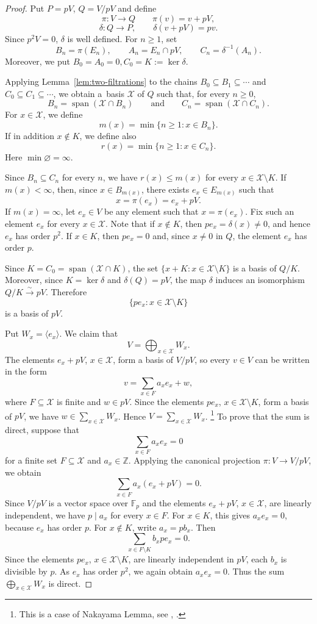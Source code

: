 \documentclass[11pt]{article}
\theoremstyle{definition}
\begin{document}
\begin{proof}
Put $P=pV$, $Q=V/pV$ and define
$$ \pi:V\to Q\qquad \pi(v)=v+pV,$$
	$$
	\delta:Q\longrightarrow P,
	\qquad
	\delta(v+pV)=pv.
	$$
Since $p^2V=0$, $\delta$ is well defined.
For $n\geq1$, set
$$
	B_n=\pi(E_n),
	\qquad
	A_n=E_n\cap pV,
	\qquad
	C_n=\delta^{-1}(A_n).
$$
Moreover, we put $ B_0=A_0=0, C_0=K:=\ker\delta.$ 

Applying Lemma~\ref{lem:two-filtrations} to the chains
$B_0\subseteq B_1\subseteq\cdots$ and
$C_0\subseteq C_1\subseteq\cdots$,
we obtain a~basis
$\mathcal X$ of $Q$ such that, for every $n\geq0$,	
$$B_n=\operatorname{span}(\mathcal X\cap B_n)\qquad\text{and}\qquad C_n=\operatorname{span}(\mathcal X\cap C_n).$$
For $x\in\mathcal X$,  we define
	$$
	m(x)=\min\{n\geq1:x\in B_n\}.
	$$
If in addition $x\notin K$, we define also
	$$
	r(x)=\min\{n\geq1:x\in C_n\}.
	$$
Here $\min\varnothing=\infty$.

	Since $B_n\subseteq C_n$ for every $n$, we have
	$r(x)\leq m(x)$ for every $x\in\mathcal X\setminus K$. If $m(x)<\infty$, then, since $x\in B_{m(x)}$, there exists $e_x\in E_{m(x)}$ such that
$$
x=\pi(e_x)=e_x+pV.
$$
If $m(x)=\infty$, let $e_x\in V$ be any element such that $x=\pi(e_x)$.
Fix such an element $e_x$ for every $x\in\mathcal X$. Note that if $x\notin K$, then $pe_x=\delta(x)\neq0$, and hence $e_x$ has order $p^2$. If $x\in K$, then $pe_x=0$ and, since $x\neq0$ in $Q$, the element $e_x$ has order $p$.
	
Since $K=C_0=\operatorname{span}(\mathcal X\cap K)$, the set $\{x+K:x\in\mathcal X\setminus K\}$
is a basis of $Q/K$. Moreover, since $K=\ker\delta$ and $\delta(Q)=pV$, the map $\delta$ induces an isomorphism $Q/K\xrightarrow{\sim}pV.$
Therefore
$$
\{pe_x:x\in\mathcal X\setminus K\}
$$
is a basis of $pV$.

Put $W_x=\langle e_x\rangle$. We claim that
$$
V=\bigoplus_{x\in\mathcal X}W_x.
$$
The elements $e_x+pV$, $x\in\mathcal X$, form a basis of $V/pV$, so every $v\in V$ can be written in the form
$$
v=\sum_{x\in F}a_xe_x+w,
$$
where $F\subseteq\mathcal X$ is finite and $w\in pV$. Since the elements $pe_x$, $x\in\mathcal X\setminus K$, form a basis of $pV$, we have $w\in\sum_{x\in\mathcal X}W_x$. Hence $V=\sum_{x\in\mathcal X}W_x$. \footnote{This is a case of Nakayama Lemma, see \cite[26.16]{Lam}, \cite[page 12]{Matsumura}. }
To prove that the sum is direct, suppose that
$$
\sum_{x\in F}a_xe_x=0
$$
for a finite set $F\subseteq\mathcal X$ and $a_x\in\mathbb Z$. Applying the canonical projection $\pi:V\to V/pV$, we obtain
$$
\sum_{x\in F}a_x(e_x+pV)=0.
$$
Since $V/pV$ is a vector space over $\mathbb F_p$ and the elements $e_x+pV$, $x\in\mathcal X$, are linearly independent, we have $p\mid a_x$ for every $x\in F$. For $x\in K$, this gives $a_xe_x=0$, because $e_x$ has order $p$. For $x\notin K$, write $a_x=pb_x$. Then
$$
\sum_{x\in F\setminus K}b_xpe_x=0.
$$
Since the elements $pe_x$, $x\in\mathcal X\setminus K$, are linearly independent in $pV$, each $b_x$ is divisible by $p$. As $e_x$ has order $p^2$, we again obtain $a_xe_x=0$. Thus the sum $\bigoplus_{x\in\mathcal X}W_x$ is direct.
	

\end{proof}
\end{document}

